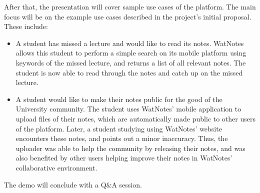 \documentclass[12pt]{article}
\begin{document}
    After that, the presentation will cover sample use cases of the platform. The main focus will be on the example use cases
    described in the project's initial proposal. These include:

    \begin{itemize}
      \item
        A student has missed a lecture and would like to read its notes. WatNotes allows this student to perform a simple search on
        its mobile platform using keywords of the missed lecture, and returns a list of all relevant notes. The student is now able
        to read through the notes and catch up on the missed lecture.
      \item
        A student would like to make their notes public for the good of the University community. The student uses WatNotes' mobile
        application to upload files of their notes, which are automatically made public to other users of the platform. Later, a student
        studying using WatNotes' website encounters these notes, and points out a minor inaccuracy. Thus, the uploader was able to help
        the community by releasing their notes, and was also benefited by other users helping improve their notes in WatNotes' collaborative
        environment.
    \end{itemize}

    The demo will conclude with a Q\&A session.
\end{document}
